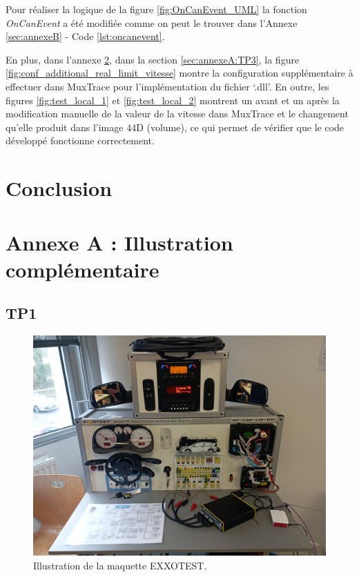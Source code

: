 \documentclass{rapportECC}
\begin{document}
Pour réaliser la logique de la figure \ref{fig:OnCanEvent_UML} la fonction \textit{OnCanEvent} a été modifiée comme on peut le trouver dans l'Annexe \ref{sec:annexeB} - Code \ref{lst:oncanevent}.

En plus, dans l'annexe \ref{sec:annexeA}, dans la section \ref{sec:annexeA:TP3}, la figure \ref{fig:conf_additional_real_limit_vitesse} montre la configuration supplémentaire à effectuer dans MuxTrace pour l'implémentation du fichier `.dll'. En outre, les figures \ref{fig:test_local_1} et \ref{fig:test_local_2} montrent un avant et un après la modification manuelle de la valeur de la vitesse dans MuxTrace et le changement qu'elle produit dans l'image 44D (volume), ce qui permet de vérifier que le code développé fonctionne correctement.

\section{Conclusion}



 


\pagebreak

\appendix

\section{Annexe A : Illustration complémentaire}\label{sec:annexeA}

\subsection{TP1}

\begin{figure}[H]
    \centering
    \includegraphics[width=.7\textwidth]{./images/maquette.jpg}
    \caption{Illustration de la maquette EXXOTEST.}
    \label{fig:maquette_EXXOTEST}
\end{figure}
\end{document}
